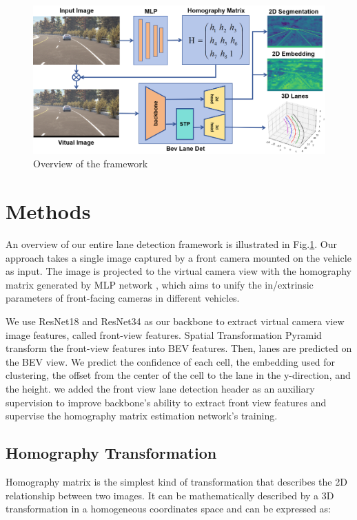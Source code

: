 \begin{figure}[ht]
    \centering
    \includegraphics[height=0.3\textheight]{asset/structure3} %
    \caption{Overview of the framework}
    \label{fig:overview}
\end{figure}

\section{Methods}
\label{sec:methods}
An overview of our entire lane detection framework is illustrated in Fig.\ref{fig:overview}.
Our approach takes a single image captured by a front camera mounted on the vehicle as input.
The image is projected to the virtual camera view with the homography
matrix generated by MLP network \cite{tang2022image},
which aims to unify the in/extrinsic parameters of front-facing cameras in different vehicles.

We use ResNet18 and ResNet34 \cite{he2016deep} as our backbone to extract virtual camera view image features, called front-view features.
Spatial Transformation Pyramid \cite{wang2023bev} transform the front-view features into BEV features.
Then, lanes are predicted on the BEV view. We predict the confidence of each cell, the embedding used for clustering,
the offset from the center of the cell to the lane in the y-direction, and the height.
we added the front view lane detection header as an
auxiliary supervision to improve backbone's ability to extract front view features
and supervise the homography matrix estimation network's training.

\subsection{Homography Transformation}
Homography matrix is the simplest kind of transformation that describes the 2D relationship between two images.
It can be mathematically described by a 3D transformation in a homogeneous coordinates space and can be expressed as:

